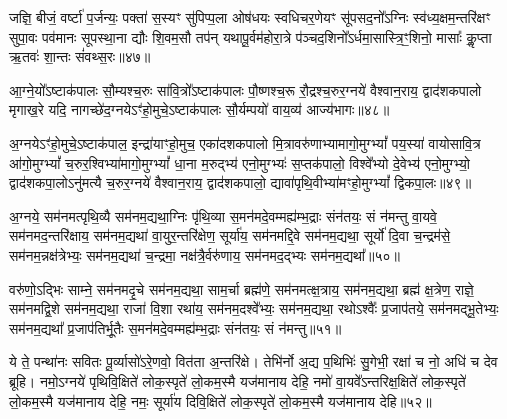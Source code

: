 जज्ञि॒ बीजं॒ वर्\mbox{}ष्टा॑ प॒र्जन्यः॒ पक्ता॑ स॒स्यꣳ सु॑पिप्प॒ला ओष॑धयः स्वधिचर॒णेयꣳ सू॑पसद॒नो᳚\-ऽग्निः स्व॑ध्य॒क्षम॒न्तरि॑क्षꣳ सुपा॒वः पव॑मानः सूपस्था॒ना द्यौः शि॒वम॒सौ तप॑न् यथापू॒र्वम॑होरा॒त्रे प॑ञ्चद॒शिनो᳚\-ऽर्धमा॒सास्त्रि॒ꣳ॒शिनो॒ मासाः᳚ कॢ॒प्ता ऋ॒तवः॑ शा॒न्तः सं॑वथ्स॒रः॥४७॥

{\anuvakamend[{जज्ञि॒ बीज॒मेक॑त्रिꣳशत्॥20॥}]}

आ॒ग्ने॒यो᳚\-ऽष्टाक॑पालः सौ॒म्यश्च॒रुः सा॑वि॒त्रो᳚\-ऽष्टाक॑पालः पौ॒ष्णश्च॒रू रौ॒द्रश्च॒रुर॒ग्नये॑ वैश्वान॒राय॒ द्वाद॑शकपालो मृगाख॒रे यदि॒ नागच्छे॑द॒ग्नये\-ऽꣳ॑हो॒मुचे॒\-ऽष्टाक॑पालः सौ॒र्यम्पयो॑ वाय॒व्य॑ आज्य॑भागः॥४८॥

{\anuvakamend[{आ॒ग्ने॒यश्चतु॑र्विꣳशतिः॥21॥}]}

अ॒ग्नये\-ऽꣳ॑हो॒मुचे॒\-ऽष्टाक॑पाल॒ इन्द्रा॑याꣳहो॒मुच॒ एका॑दशकपालो मि॒त्रावरु॑णाभ्यामागो॒मुग्\-भ्यां᳚ पय॒स्या॑ वायोसावि॒त्र आ॑गो॒मुग्\-भ्यां᳚ च॒रुर॒श्विभ्या॑मागो॒मुग्\-भ्यां᳚ धा॒ना म॒रुद्भ्य॑ एनो॒मुग्भ्यः॑ स॒प्तक॑पालो॒ विश्वे᳚भ्यो दे॒वेभ्य॑ एनो॒मुग्भ्यो॒ द्वाद॑शकपा॒लो\-ऽनु॑मत्यै च॒रुर॒ग्नये॑ वैश्वान॒राय॒ द्वाद॑शकपालो॒ द्यावा॑पृथि॒वीभ्या॑मꣳहो॒मुग्\-भ्यां᳚ द्विकपा॒लः॥४९॥

{\anuvakamend[{अ॒ग्नये\-ऽꣳ॑हो॒मुचे᳚ त्रि॒ꣳ॒शत्॥22॥}]}

अ॒ग्नये॒ सम॑नमत्पृथि॒व्यै सम॑नम॒द्यथा॒ग्निः पृ॑थि॒व्या स॒मन॑मदे॒वम्मह्य॑म्भ॒द्राः संन॑तयः॒ सं न॑मन्तु वा॒यवे॒ सम॑नमद॒न्तरि॑क्षाय॒ सम॑नम॒द्यथा॑ वा॒युर॒न्तरि॑क्षेण॒ सूर्या॑य॒ सम॑नमद्दि॒वे सम॑नम॒द्यथा॒ सूर्यो॑ दि॒वा च॒न्द्रम॑से॒ सम॑नम॒न्नक्ष॑त्रेभ्यः॒ सम॑नम॒द्यथा॑ च॒न्द्रमा॒ नक्ष॑त्रै॒र्वरु॑णाय॒ सम॑नमद॒द्भ्यः सम॑नम॒द्यथा᳚॥५०॥

वरु॑णो॒\-ऽद्भिः साम्ने॒ सम॑नमदृ॒चे सम॑नम॒द्यथा॒ साम॒र्चा ब्रह्म॑णे॒ सम॑नमत्क्ष॒त्राय॒ सम॑नम॒द्यथा॒ ब्रह्म॑ क्ष॒त्रेण॒ राज्ञे॒ सम॑नमद्वि॒शे सम॑नम॒द्यथा॒ राजा॑ वि॒शा रथा॑य॒ सम॑नम॒दश्वे᳚भ्यः॒ सम॑नम॒द्यथा॒ रथो\-ऽश्वैः᳚ प्र॒जाप॑तये॒ सम॑नमद्भू॒तेभ्यः॒ सम॑नम॒द्यथा᳚ प्र॒जाप॑तिर्भू॒तैः स॒मन॑मदे॒वम्मह्य॑म्भ॒द्राः संन॑तयः॒ सं न॑मन्तु॥५१॥

{\anuvakamend[{अ॒द्भ्यः सम॑नम॒द्यथा॒ मह्यं॑ च॒त्वारि॑ च॥23॥}]}

ये ते॒ पन्था॑नः सवितः पू॒र्व्यासो॑\-ऽरे॒णवो॒ वित॑ता अ॒न्तरि॑क्षे। तेभि॑र्नो अ॒द्य प॒थिभिः॑ सु॒गेभी॒ रक्षा॑ च नो॒ अधि॑ च देव ब्रूहि। नमो॒\-ऽग्नये॑ पृथिवि॒क्षिते॑ लोक॒स्पृते॑ लो॒कम॒स्मै यज॑मानाय देहि॒ नमो॑ वा॒यवे᳚\-ऽन्तरिक्ष॒क्षिते॑ लोक॒स्पृते॑ लो॒कम॒स्मै यज॑मानाय देहि॒ नमः॒ सूर्या॑य दिवि॒क्षिते॑ लोक॒स्पृते॑ लो॒कम॒स्मै यज॑मानाय देहि॥५२॥

{\anuvakamend[{ये ते॒ चतु॑श्चत्वारिꣳशत्॥24॥}]}

